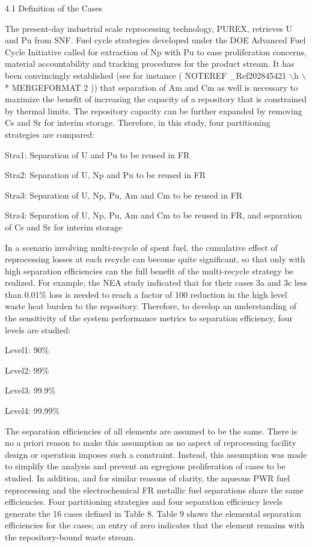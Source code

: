 4.1 Definition of the Cases

	The present-day industrial scale reprocessing technology, PUREX,
retrieves U and Pu from SNF. Fuel cycle strategies developed under the
DOE Advanced Fuel Cycle Initiative called for extraction of Np with Pu
to ease proliferation concerns, material accountability and tracking
procedures for the product stream. It has been convincingly established
(see for instance (  NOTEREF \_Ref202845421 $\backslash$h  $\backslash$*
MERGEFORMAT  2 )) that separation of Am and Cm as well is necessary to
maximize the benefit of increasing the capacity of a repository that is
constrained by thermal limits.  The repository capacity can be further
expanded by removing Cs and Sr for interim storage. Therefore, in this
study, four partitioning strategies are compared:

Stra1: Separation of U and Pu to be reused in FR

Stra2: Separation of U, Np and Pu to be reused in FR

Stra3: Separation of U, Np, Pu, Am and Cm to be reused in FR

Stra4: Separation of U, Np, Pu, Am and Cm to be reused in FR, and
separation of Cs and Sr for interim storage

	In a scenario involving multi-recycle of spent fuel, the cumulative
effect of reprocessing losses at each recycle can become quite
significant, so that only with high separation efficiencies can the full
benefit of the multi-recycle strategy be realized.  For example, the NEA
study indicated that for their cases 3a and 3c less than 0.01\% loss is
needed to reach a factor of 100 reduction in the high level waste heat
burden to the repository.  Therefore, to develop an understanding of the
sensitivity of the system performance metrics to separation efficiency,
four levels are studied:

Level1: 90\%

Level2: 99\% 

Level3: 99.9\%

Level4: 99.99\%

	The separation efficiencies of all elements are assumed to be the same.
 There is no a priori reason to make this assumption as no aspect of
reprocessing facility design or operation imposes such a constraint. 
Instead, this assumption was made to simplify the analysis and prevent
an egregious proliferation of cases to be studied.  In addition, and for
similar reasons of clarity, the aqueous PWR fuel reprocessing and the
electrochemical FR metallic fuel separations share the same
efficiencies. Four partitioning strategies and four separation
efficiency levels generate the 16 cases defined in Table 8.  Table 9
shows the elemental separation efficiencies for the cases; an entry of
zero indicates that the element remains with the repository-bound waste
stream.


